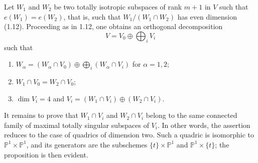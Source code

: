 Let $W_1$ and $W_2$ be two totally isotropic subspaces of rank $m+1$ in
$V$ such that $e(W_1)=e(W_2)$, that is, such that
$W_1/(W_1\cap W_2)$ has even dimension (1.12).  Proceeding as in 1.12,
one obtains an orthogonal decomposition
\begin{equation*}
V=V_0\oplus\bigoplus_i V_i
\end{equation*}
such that
\begin{enumerate}[label=\alph*),leftmargin=2.5em]
\item $W_\alpha=(W_\alpha\cap V_0)\oplus
  \displaystyle\bigoplus_i(W_\alpha\cap V_i)$ for $\alpha=1,2$;
\item $W_1\cap V_0=W_2\cap V_0$;
\item $\dim V_i=4$ and
  $V_i=(W_1\cap V_i)\oplus(W_2\cap V_i)$.
\end{enumerate}
It remains to prove that $W_1\cap V_i$ and $W_2\cap V_i$ belong to the
same connected family of maximal totally singular subspaces of $V_i$.
In other words, the assertion reduces to the case of quadrics of
dimension two.  Such a quadric is isomorphic to
$\mathbb P^1\times\mathbb P^1$, and its generators are the subschemes
$\{t\}\times\mathbb P^1$ and $\mathbb P^1\times\{t\}$; the proposition
is then evident.

